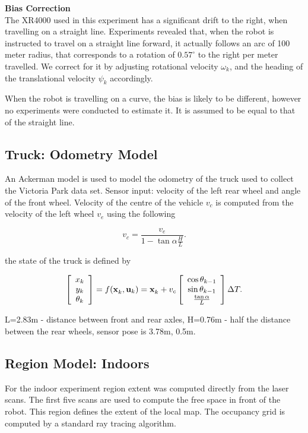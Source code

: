 {\bf Bias Correction}\\ The XR4000 used in this experiment has a
significant drift to the right, when travelling on a straight
line. Experiments revealed that, when the robot is instructed to
travel on a straight line forward, it actually follows an arc of 
100 meter radius, that corresponds to a rotation of $0.57^\circ$ to
the right per meter travelled. We correct for it by adjusting
rotational velocity $\omega_k$, and the heading of the translational
velocity $\psi_k$ accordingly.

When the robot is travelling on a curve, the bias is likely to be
different, however no experiments were conducted to estimate it. It is
assumed to be equal to that of the straight line.


\subsection{Truck: Odometry Model}

An Ackerman model is used to model the odometry of the truck used to
collect the Victoria Park data set. Sensor input: velocity of the left
rear wheel and angle of the front wheel. Velocity of the centre of the
vehicle $v_c$ is computed from the velocity of the left wheel $v_e$
using the following

$$
v_c = \frac{v_e}{1 - \tan \alpha \frac{H}{L}}.
$$

the state of the truck is defined by

$$
\Vector{x_k\\y_k\\\theta_k} = f(\x{k}{}{},\U{k}) = 
\x{k}{}{} + v_c \Vector{\cos \theta_{k-1} \\ \sin
  \theta_{k-1} \\ \frac{\tan \alpha}{L}} \Delta T.
$$


L=2.83m - distance between front and rear axles, H=0.76m - half the
distance between the rear wheels, sensor pose is 3.78m, 0.5m.

\subsection{Region Model: Indoors}

For the indoor experiment region extent was computed directly from the
laser scans. The first five scans are used to compute the free space in
front of the robot. This region defines the extent of the local map.
The occupancy grid is computed by a standard ray tracing algorithm.


